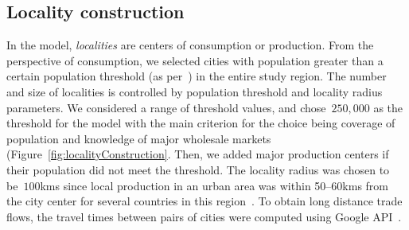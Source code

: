 \documentclass[10pt]{article}
\theoremstyle{definition}
\begin{document}
\subsection{Locality construction}\label{sec:locality}
In the model, \emph{localities} are centers of consumption or production.
From the perspective of consumption, we selected cities with population
greater than a certain population threshold (as per~\cite{maxmind}) in the
entire study region. The number and size of localities is controlled by
population threshold and locality radius parameters. We considered a range of threshold values, and
chose~$250,000$ as the threshold for the model with the main criterion for
the choice being coverage of population and knowledge of major wholesale
markets (Figure~\ref{fig:localityConstruction}. Then, we added major production centers if their population did
not meet the threshold. The locality radius was chosen to be~$100$kms since
local production in an urban area was within 50--60kms from the city center
for several countries in this
region~\cite{buntong2013,sokhen2004vegetable,wijk2007}. To obtain long
distance trade flows, the travel times between pairs of cities were
computed using Google API~\cite{googleapi}.
\end{document}
